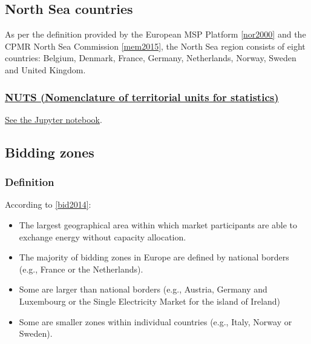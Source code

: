\hypertarget{north-sea-countries}{%
\subsection{North Sea countries}\label{north-sea-countries}}

As per the definition provided by the European MSP Platform
\protect\hyperlink{nor0000}{{[}nor2000{]}} and the CPMR North Sea
Commission \protect\hyperlink{mem2015}{{[}mem2015{]}}, the North Sea
region consists of eight countries: Belgium, Denmark, France, Germany,
Netherlands, Norway, Sweden and United Kingdom.

\hypertarget{nuts-nomenclature-of-territorial-units-for-statistics}{%
\subsubsection{\texorpdfstring{\href{https://ec.europa.eu/eurostat/web/nuts/background}{NUTS
(Nomenclature of territorial units for
statistics)}}{NUTS (Nomenclature of territorial units for statistics)}}\label{nuts-nomenclature-of-territorial-units-for-statistics}}

\href{https://github.com/ENSYSTRA/short-term-forecasting/tree/master/jupyter-notebooks/NUTS.ipynb}{See
the Jupyter notebook}.

\hypertarget{bidding-zones}{%
\subsection{Bidding zones}\label{bidding-zones}}

\hypertarget{definition}{%
\subsubsection{Definition}\label{definition}}

According to \protect\hyperlink{bid2014}{{[}bid2014{]}}:

\begin{itemize}
\tightlist
\item
  The largest geographical area within which market participants are
  able to exchange energy without capacity allocation.
\item
  The majority of bidding zones in Europe are defined by national
  borders (e.g., France or the Netherlands).
\item
  Some are larger than national borders (e.g., Austria, Germany and
  Luxembourg or the Single Electricity Market for the island of Ireland)
\item
  Some are smaller zones within individual countries (e.g., Italy,
  Norway or Sweden).
\end{itemize}

